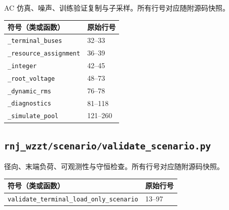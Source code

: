 AC 仿真、噪声、训练验证复制与子采样。所有行号对应随附源码快照。
\begin{longtable}{P{0.73\textwidth}P{0.18\textwidth}}\toprule 符号（类或函数） & 原始行号\\\midrule\endhead
\nolinkurl{_terminal_buses} & 32--33 \\
\nolinkurl{_resource_assignment} & 36--39 \\
\nolinkurl{_integer} & 42--45 \\
\nolinkurl{_root_voltage} & 48--73 \\
\nolinkurl{_dynamic_rms} & 76--78 \\
\nolinkurl{_diagnostics} & 81--118 \\
\nolinkurl{_simulate_pool} & 121--260 \\
\bottomrule\end{longtable}
\subsection{\texorpdfstring{\nolinkurl{rnj_wzzt/scenario/validate_scenario.py}}{rnj\_wzzt/scenario/validate\_scenario.py}}\label{module:scenario.validate_scenario}
径向、末端负荷、可观测性与守恒检查。所有行号对应随附源码快照。
\begin{longtable}{P{0.73\textwidth}P{0.18\textwidth}}\toprule 符号（类或函数） & 原始行号\\\midrule\endhead
\nolinkurl{validate_terminal_load_only_scenario} & 13--97 \\
\bottomrule\end{longtable}